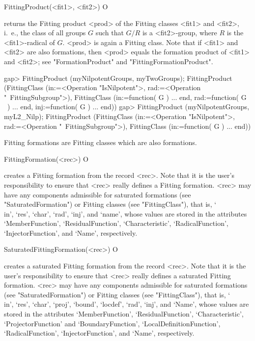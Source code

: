\>FittingProduct(<fit1>, <fit2>) O

returns the Fitting product <prod> of the Fitting classes <fit1> and <fit2>,
i.~e., the class of all groups $G$ such that $G/R$ is  a <fit2>-group, where
$R$ is the <fit1>-radical of $G$.  <prod> is again a Fitting class.
Note that if <fit1> and <fit2> are also
formations, then <prod> equals the
formation product of <fit1> and <fit2>; see "FormationProduct" 
and
"FittingFormationProduct".

\beginexample
gap> FittingProduct (myNilpotentGroups, myTwoGroups);
FittingProduct (FittingClass (in:=<Operation "IsNilpotent">, rad:=<Operation "\
FittingSubgroup">), FittingClass (in:=function( G ) ... end, rad:=function( G \
) ... end, inj:=function( G ) ... end))
gap> FittingProduct (myNilpotentGroups, myL2_Nilp);
FittingProduct (FittingClass (in:=<Operation "IsNilpotent">, rad:=<Operation "\
FittingSubgroup">), FittingClass (in:=function( G ) ... end))
\endexample


\null

\index{Fitting formations!creating}

Fitting formations are Fitting classes which are also formations.

\>FittingFormation(<rec>) O

creates a Fitting formation from the record <rec>. Note that it is the user's 
responsibility to ensure that <rec> really defines a Fitting formation.
<rec> may  have any components admissible for saturated formations (see
"SaturatedFormation")  or Fitting classes (see "FittingClass"), that is,
`\\in', `res', `char', `rad', `inj', and `name', 
 whose values are stored in the attributes `MemberFunction',
`ResidualFunction', `Characteristic',  `RadicalFunction',
`InjectorFunction',  and `Name', respectively.

\>SaturatedFittingFormation(<rec>) O

creates a saturated Fitting formation from the record <rec>. Note that it is the user's responsibility to ensure that <rec> really
defines a saturated Fitting formation. <rec> may have any
components admissible for saturated formations (see "SaturatedFormation") or
Fitting classes (see "FittingClass"), that is, `\\in', `res', `char', `proj',
`bound', `locdef', `rad', `inj',  and `Name', whose values are stored in the
attributes `MemberFunction', `ResidualFunction', `Characteristic', 
`ProjectorFunction' and `BoundaryFunction',  `LocalDefinitionFunction',
`RadicalFunction', `InjectorFunction', and `Name', respectively.



